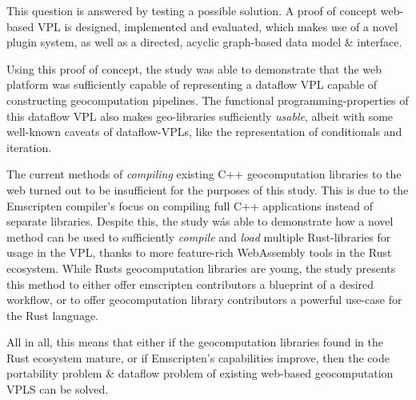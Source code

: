 This question is answered by testing a possible solution.
A proof of concept web-based VPL is designed, implemented and evaluated, which makes use of a novel plugin system, as well as a directed, acyclic graph-based data model \& interface.

Using this proof of concept, the study was able to demonstrate that the web platform was sufficiently capable of representing a dataflow VPL capable of constructing geocomputation pipelines.
The functional programming-properties of this dataflow VPL also makes geo-libraries sufficiently \emph{usable}, albeit with some well-known caveats of dataflow-VPLs, like the representation of conditionals and iteration.  

The current methods of \emph{compiling} existing C++ geocomputation libraries to the web turned out to be insufficient for the purposes of this study.  
This is due to the Emscripten compiler's focus on compiling full C++ applications instead of separate libraries. 
Despite this, the study wás able to demonstrate how a novel method can be used to sufficiently \emph{compile} and \emph{load} multiple Rust-libraries for usage in the VPL, thanks to more feature-rich WebAssembly tools in the Rust ecosystem. 
While Rusts geocomputation libraries are young, the study presents this method to either offer emscripten contributors a blueprint of a desired workflow, or to offer geocomputation library contributors a powerful use-case for the Rust language. 

All in all, this means that either if the geocomputation libraries found in the Rust ecosystem mature, or if Emscripten's capabilities improve, then the code portability problem \& dataflow problem of existing web-based geocomputation VPLS can be solved. 




    
    
